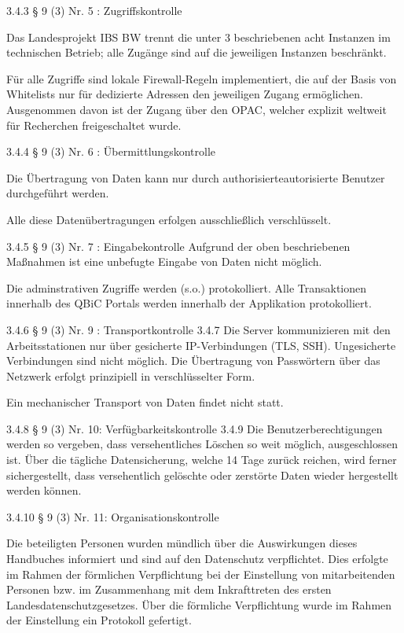 \documentclass[]{scrreprt}
\begin{document}
3.4.3 § 9 (3) Nr. 5 : Zugriffskontrolle

Das Landesprojekt IBS BW trennt die unter 3 beschriebenen acht Instanzen im technischen Betrieb; alle Zugänge sind auf die jeweiligen Instanzen beschränkt.

Für alle Zugriffe sind lokale Firewall-Regeln implementiert, die auf der Basis von Whitelists nur für dedizierte Adressen den jeweiligen Zugang ermöglichen. Ausgenommen davon ist der Zugang über den OPAC, welcher explizit weltweit für Recherchen freigeschaltet wurde.


3.4.4 § 9 (3) Nr. 6 : Übermittlungskontrolle

Die Übertragung von Daten kann nur durch authorisierteautorisierte Benutzer durchgeführt werden. 



Alle diese Datenübertragungen erfolgen ausschließlich verschlüsselt.

3.4.5 § 9 (3) Nr. 7 : Eingabekontrolle
Aufgrund der oben beschriebenen Maßnahmen ist eine unbefugte Eingabe von Daten nicht möglich. 

Die adminstrativen Zugriffe werden (s.o.) protokolliert. Alle Transaktionen innerhalb des QBiC Portals werden innerhalb der Applikation protokolliert.

3.4.6 § 9 (3) Nr. 9 : Transportkontrolle
3.4.7 
Die Server kommunizieren mit den Arbeitsstationen nur über gesicherte IP-Verbindungen (TLS, SSH). Ungesicherte Verbindungen sind nicht möglich. Die Übertragung von Passwörtern über das Netzwerk erfolgt prinzipiell in verschlüsselter Form.

Ein mechanischer Transport von Daten findet nicht statt.

3.4.8 § 9 (3) Nr. 10: Verfügbarkeitskontrolle
3.4.9 
Die Benutzerberechtigungen werden so vergeben, dass versehentliches Löschen so weit möglich, ausgeschlossen ist. Über die tägliche Datensicherung, welche 14 Tage zurück reichen, wird ferner sichergestellt, dass versehentlich gelöschte oder zerstörte Daten wieder hergestellt werden können.

3.4.10 § 9 (3) Nr. 11: Organisationskontrolle

Die beteiligten Personen wurden mündlich über die Auswirkungen dieses Handbuches informiert und sind auf den Datenschutz verpflichtet. Dies erfolgte im Rahmen der förmlichen Verpflichtung bei der Einstellung von mitarbeitenden Personen bzw. im Zusammenhang mit dem Inkrafttreten des ersten Landesdatenschutzgesetzes. Über die förmliche Verpflichtung wurde im Rahmen der Einstellung ein Protokoll gefertigt.
\end{document}
